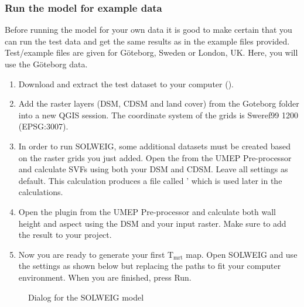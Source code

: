 \documentclass[letterpaper,10pt,english]{sphinxmanual}
\begin{document}
\subsubsection{Run the model for example data}
\label{\detokenize{OtherManuals/SOLWEIG:run-the-model-for-example-data}}
Before running the model for your own data it is good to make certain
that you can run the test data and get the same results as in the
example files provided. Test/example files are given for Göteborg,
Sweden or London, UK. Here, you will use the Göteborg data.
\begin{enumerate}
\item {} 
Download and extract the test dataset to your computer
().

\item {} 
Add the raster layers (DSM, CDSM and land cover) from the Goteborg
folder into a new QGIS session. The coordinate system of the grids is
Sweref99 1200 (EPSG:3007).

\item {} 
In order to run SOLWEIG, some additional datasets must be created
based on the raster grids you just added. Open the  from the UMEP Pre-processor and calculate SVFs using
both your DSM and CDSM. Leave all settings as default. This
calculation produces a file called ’ which is used later
in the calculations.

\item {} 
Open the  plugin from the UMEP
Pre-processor and calculate both wall height and aspect using the DSM
and your input raster. Make sure to add the result to your project.

\item {} 
Now you are ready to generate your first T$_{\text{mrt}}$ map. Open
SOLWEIG and use the settings as shown below but replacing the paths
to fit your computer environment. When you are finished, press Run.

\end{enumerate}

\begin{figure}[htbp]
\centering
\capstart

\noindent{}
\caption{Dialog for the SOLWEIG model}\label{\detokenize{OtherManuals/SOLWEIG:id22}}\end{figure}
\end{document}
